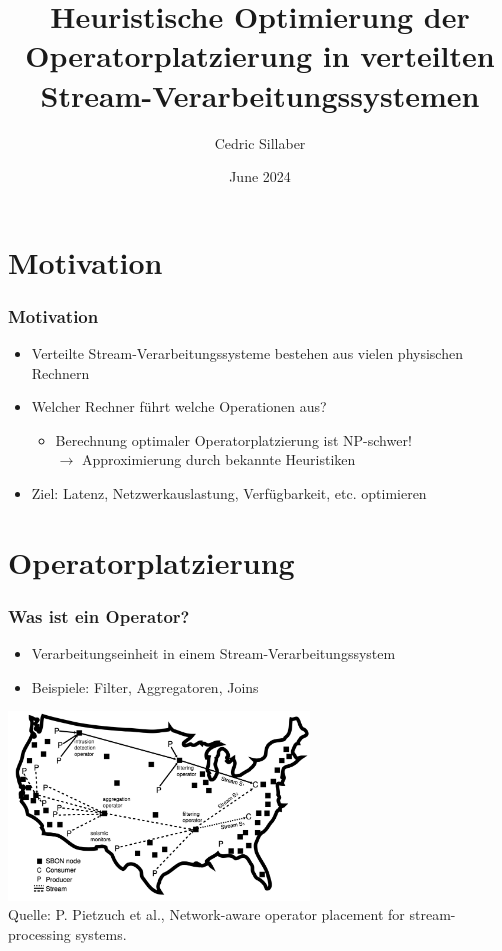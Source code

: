 \documentclass{beamer}
\title{Heuristische Optimierung der Operatorplatzierung in verteilten Stream-Verarbeitungssystemen}
\author{Cedric Sillaber}
\date{June 2024}
\begin{document}
\frame{\titlepage}




\section{Motivation}
\begin{frame}
\frametitle{Motivation}
\begin{itemize}
    \item Verteilte Stream-Verarbeitungssysteme bestehen aus vielen physischen Rechnern
    \item Welcher Rechner führt welche Operationen aus?
    \begin{itemize}
        \item Berechnung optimaler Operatorplatzierung ist NP-schwer! \\
        $\rightarrow$ Approximierung durch bekannte Heuristiken
    \end{itemize}
    \item Ziel: Latenz, Netzwerkauslastung, Verfügbarkeit, etc. optimieren
\end{itemize}
\end{frame}


\section{Operatorplatzierung}
\begin{frame}
\frametitle{Was ist ein Operator?}
\begin{itemize}
    \item Verarbeitungseinheit in einem Stream-Verarbeitungssystem
    \item Beispiele: Filter, Aggregatoren, Joins
\end{itemize}
\begin{center}
    \includegraphics[width=0.6\textwidth]{res/SVS.png} \\
    \tiny \color{gray} Quelle: P. Pietzuch et al., Network-aware operator placement for stream-processing systems.
\end{center}
\end{frame}
\end{document}
